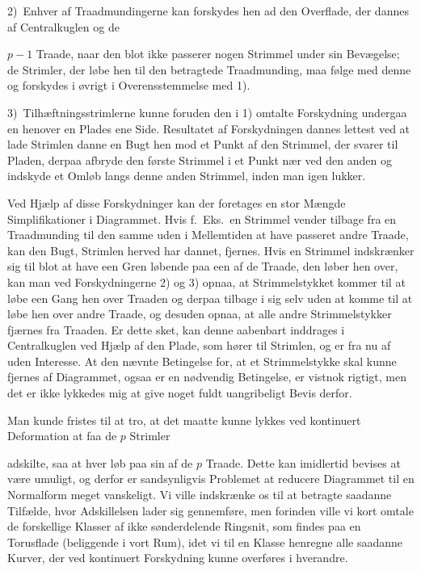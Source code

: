 \documentclass{article}
\begin{document}
2)~Enhver af Traadmundingerne kan forskydes hen ad den Overflade, der dannes af Centralkuglen og de

$p - 1$ Traade, naar den blot ikke passerer nogen Strimmel under sin Bevægelse; de Strimler, der løbe hen til den betragtede Traadmunding, maa følge med denne og forskydes i øvrigt i Overensstemmelse med 1).

3)~Tilhæftningsstrimlerne kunne foruden den i 1) omtalte Forskydning undergaa en henover en Plades ene Side. Resultatet af Forskydningen dannes lettest ved at lade Strimlen danne en Bugt hen mod et Punkt af den Strimmel, der svarer til Pladen, derpaa afbryde den første Strimmel i et Punkt nær ved den anden og indskyde et Omløb langs denne anden Strimmel, inden man igen lukker.

Ved Hjælp af disse Forskydninger kan der foretages en stor Mængde Simplifikationer i Diagrammet. Hvis f.~Eks.\ en Strimmel vender tilbage fra en Traadmunding til den samme uden i Mellemtiden at have passeret andre Traade, kan den Bugt, Strimlen herved har dannet, fjernes. Hvis en Strimmel indskrænker sig til blot at have een Gren løbende paa een af de Traade, den løber hen over, kan man ved Forskydningerne 2) og 3) opnaa, at Strimmelstykket kommer til at løbe een Gang hen over Traaden og derpaa tilbage i sig selv uden at komme til at løbe hen over andre Traade, og desuden opnaa, at alle andre Strimmelstykker fjærnes fra Traaden. Er dette sket, kan denne aabenbart inddrages i Centralkuglen ved Hjælp af den Plade, som hører til Strimlen, og er fra nu af uden Interesse. At den nævnte Betingelse for, at et Strimmelstykke skal kunne fjernes af Diagrammet, ogsaa er en nødvendig Betingelse, er vistnok rigtigt, men det er ikke lykkedes mig at give noget fuldt uangribeligt Bevis derfor.

Man kunde fristes til at tro, at det maatte kunne lykkes ved kontinuert Deformation at faa de $p$ Strimler

adskilte, saa at hver løb paa sin af de $p$ Traade. Dette kan imidlertid bevises at være umuligt, og derfor er sandsynligvis Problemet at reducere Diagrammet til en Normalform meget vanskeligt. Vi ville indskrænke os til at betragte saadanne Tilfælde, hvor Adskillelsen lader sig gennemføre, men forinden ville vi kort omtale de forskellige Klasser af ikke sønderdelende Ringsnit, som findes paa en Torusflade (beliggende i vort Rum), idet vi til en Klasse henregne alle saadanne Kurver, der ved kontinuert Forskydning kunne overføres i hverandre.
\end{document}
